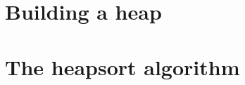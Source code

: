 \subsection{}

\subsection{}

\section{Building a heap}
\subsection{}

\subsection{}

\subsection{}

\section{The heapsort algorithm}
\subsection{}

\subsection{}

\subsection{}

